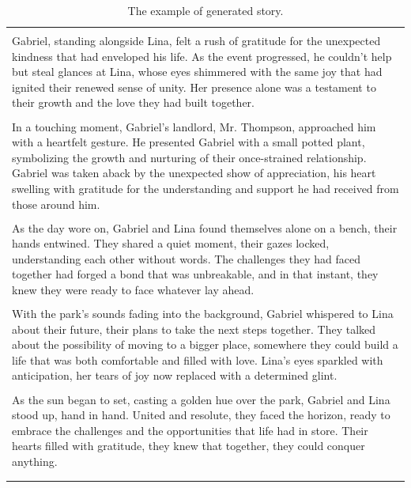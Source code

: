 \begin{small}
\begin{longtable}{p{}}
\\
\\
Gabriel, standing alongside Lina, felt a rush of gratitude for the unexpected kindness that had enveloped his life. As the event progressed, he couldn't help but steal glances at Lina, whose eyes shimmered with the same joy that had ignited their renewed sense of unity. Her presence alone was a testament to their growth and the love they had built together.
\\
\\
In a touching moment, Gabriel's landlord, Mr. Thompson, approached him with a heartfelt gesture. He presented Gabriel with a small potted plant, symbolizing the growth and nurturing of their once-strained relationship. Gabriel was taken aback by the unexpected show of appreciation, his heart swelling with gratitude for the understanding and support he had received from those around him.
\\
\\
As the day wore on, Gabriel and Lina found themselves alone on a bench, their hands entwined. They shared a quiet moment, their gazes locked, understanding each other without words. The challenges they had faced together had forged a bond that was unbreakable, and in that instant, they knew they were ready to face whatever lay ahead.
\\
\\
With the park's sounds fading into the background, Gabriel whispered to Lina about their future, their plans to take the next steps together. They talked about the possibility of moving to a bigger place, somewhere they could build a life that was both comfortable and filled with love. Lina's eyes sparkled with anticipation, her tears of joy now replaced with a determined glint.
\\
\\
As the sun began to set, casting a golden hue over the park, Gabriel and Lina stood up, hand in hand. United and resolute, they faced the horizon, ready to embrace the challenges and the opportunities that life had in store. Their hearts filled with gratitude, they knew that together, they could conquer anything.
\\
\\
\bottomrule
\caption{The example of generated story.}
\label{tab: story example1}
\end{longtable}
\end{small}

